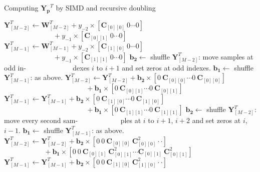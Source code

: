 \begin{algorithm}[t]
    \caption{Computing $\bm{Y_p}^T$ by SIMD and recursive doubling}\label{recursive_doubling}
    \begin{algorithmic}[1]
            \State $\bm{Y}^T_{[M-2]} \gets \bm{W}^T_{[M-2]} + y_{-2}\times \left[\bm{C}_{[0][0]} ~ 0 \cdots 0\right]$ 
            \Statex $ \quad\quad\quad\quad\quad\quad\quad + y_{-1}\times \left[\bm{C}_{[0][1]} ~ 0 \cdots 0\right]$ 
            \State $\bm{Y}^T_{[M-1]} \gets \bm{W}^T_{[M-1]} + y_{-2}\times \left[\bm{C}_{[1][0]} ~ 0 \cdots 0\right]$ 
            \Statex $ \quad\quad\quad\quad\quad\quad\quad + y_{-1}\times \left[\bm{C}_{[1][1]} ~ 0 \cdots 0\right]$ 
                    \State $\bm{b_2} \gets $ shuffle $\bm{Y}^T_{[M{-}2]}$: move samples at odd in-
                    \Statex $\quad\quad\quad\quad\quad\quad$ dexes $i$ to $i+1$ and set zeros at odd indexes. 
                    \State $\bm{b_1} \gets $ shuffle $\bm{Y}^T_{[M-1]}$: as above.
                    \State $\bm{Y}^T_{[M-2]} \gets \bm{Y}^T_{[M-2]} {+} \bm{b_{2}}{\times} \left[0 ~ \bm{C}_{[0][0]}\cdots0 ~ \bm{C}_{[0][0]} \right]$ 
                    \Statex $ \quad\quad\quad\quad\quad\quad\quad\quad\quad\quad\quad~~~ + \bm{b_{1}}\times \left[0 ~ \bm{C}_{[0][1]} \cdots 0 ~ \bm{C}_{[0][1]}\right]$ 
                    \State $\bm{Y}^T_{[M-1]} \gets \bm{Y}^T_{[M-1]} {+} \bm{b_{2}}{\times} \left[0 ~ \bm{C}_{[1][0]}\cdots 0 ~ \bm{C}_{[1][0]}\right]$ 
                    \Statex $ \quad\quad\quad\quad\quad\quad\quad\quad\quad\quad\quad~~~ + \bm{b_{1}}\times \left[0 ~ \bm{C}_{[1][1]}\cdots 0 ~ \bm{C}_{[1][1]}\right]$ 
                    \State $\bm{b_2} \gets $ shuffle $\bm{Y}^T_{[M-2]}$: move every second sam-
                    \Statex $\quad\quad\quad\quad\quad~~$ ples at $i$ to $i{+}1$, $i{+}2$ and set zeros at $i$, $i{-}1$.
                    \State $\bm{b_1} \gets $ shuffle $\bm{Y}^T_{[M-1]}$: as above.
                    \State $\bm{Y}^T_{[M-2]} \gets \bm{Y}^T_{[M-2]} {+} \bm{b_{2}} {\times} \left[0 ~ 0 ~ \bm{C}_{[0][0]} ~ \bm{C}^2_{[0][0]}\cdot\cdot \right]$ 
                    \Statex $ \quad\quad\quad\quad\quad~~~ + \bm{b_{1}} {\times} \left[0 ~ 0 ~ \bm{C}_{[0][1]} ~ \bm{C}^2_{[0][1]} \cdots \bm{C}_{[0][1]} ~ \bm{C}^2_{[0][1]}\right]$ 
                    \State $\bm{Y}^T_{[M-1]} \gets \bm{Y}^T_{[M-1]} {+} \bm{b_{2}} {\times} \left[0 ~ 0 ~ \bm{C}_{[1][0]} ~ \bm{C}^2_{[1][0]} \cdot\cdot \right]$ 

\end{algorithmic}
\end{algorithm}
